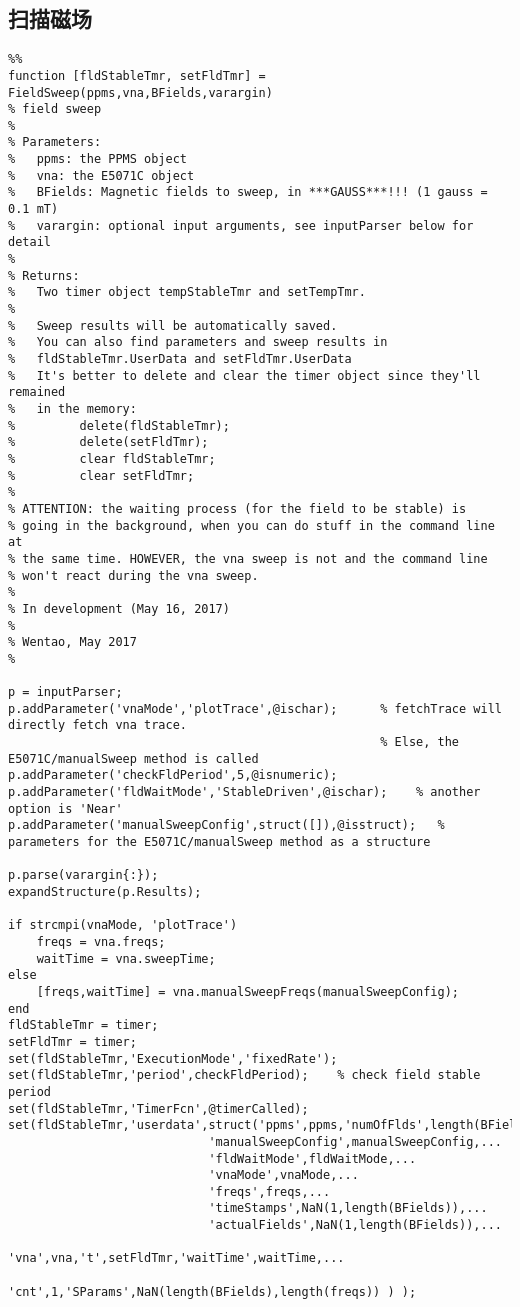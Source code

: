   \subsection{扫描磁场} %
  \label{sub:扫描磁场}
  \begin{lstlisting}
%%
function [fldStableTmr, setFldTmr] = FieldSweep(ppms,vna,BFields,varargin)
% field sweep
%
% Parameters:
%   ppms: the PPMS object
%   vna: the E5071C object
%   BFields: Magnetic fields to sweep, in ***GAUSS***!!! (1 gauss = 0.1 mT)
%   varargin: optional input arguments, see inputParser below for detail
%
% Returns:
%   Two timer object tempStableTmr and setTempTmr.
% 
%   Sweep results will be automatically saved.
%   You can also find parameters and sweep results in
%   fldStableTmr.UserData and setFldTmr.UserData
%   It's better to delete and clear the timer object since they'll remained
%   in the memory:
%         delete(fldStableTmr);
%         delete(setFldTmr);
%         clear fldStableTmr;
%         clear setFldTmr;
%
% ATTENTION: the waiting process (for the field to be stable) is 
% going in the background, when you can do stuff in the command line at
% the same time. HOWEVER, the vna sweep is not and the command line 
% won't react during the vna sweep.
%
% In development (May 16, 2017)
% 
% Wentao, May 2017
%

p = inputParser;
p.addParameter('vnaMode','plotTrace',@ischar);      % fetchTrace will directly fetch vna trace.
                                                    % Else, the E5071C/manualSweep method is called
p.addParameter('checkFldPeriod',5,@isnumeric);
p.addParameter('fldWaitMode','StableDriven',@ischar);    % another option is 'Near'
p.addParameter('manualSweepConfig',struct([]),@isstruct);   % parameters for the E5071C/manualSweep method as a structure

p.parse(varargin{:});
expandStructure(p.Results);

if strcmpi(vnaMode, 'plotTrace')
    freqs = vna.freqs;
    waitTime = vna.sweepTime;
else
    [freqs,waitTime] = vna.manualSweepFreqs(manualSweepConfig);
end
fldStableTmr = timer;
setFldTmr = timer;
set(fldStableTmr,'ExecutionMode','fixedRate');
set(fldStableTmr,'period',checkFldPeriod);    % check field stable period
set(fldStableTmr,'TimerFcn',@timerCalled);
set(fldStableTmr,'userdata',struct('ppms',ppms,'numOfFlds',length(BFields),...
                            'manualSweepConfig',manualSweepConfig,...
                            'fldWaitMode',fldWaitMode,...
                            'vnaMode',vnaMode,...
                            'freqs',freqs,...
                            'timeStamps',NaN(1,length(BFields)),...
                            'actualFields',NaN(1,length(BFields)),...
                            'vna',vna,'t',setFldTmr,'waitTime',waitTime,...
                            'cnt',1,'SParams',NaN(length(BFields),length(freqs)) ) );


\end{lstlisting}
